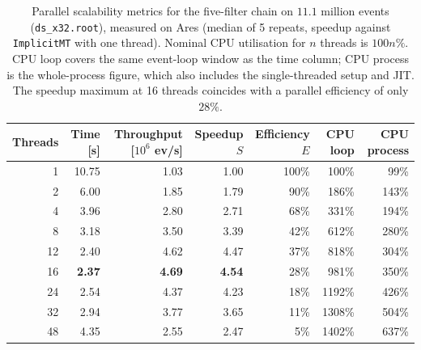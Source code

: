 \begin{table}[htbp]
\centering
\caption{Parallel scalability metrics for the five-filter chain on $11.1$ million events (\texttt{ds\_x32.root}), measured on Ares (median of 5 repeats, speedup against \texttt{ImplicitMT} with one thread). Nominal CPU utilisation for $n$ threads is $100n\%$. CPU loop covers the same event-loop window as the time column; CPU process is the whole-process figure, which also includes the single-threaded setup and JIT. The speedup maximum at 16 threads coincides with a parallel efficiency of only $28\%$.}
\label{tab:scalability-chain}
\begin{tabular}{rrrrrrr}
\toprule
Threads & Time [s] & Throughput [$10^6$ ev/s] & Speedup $S$ & Efficiency $E$ & CPU loop & CPU process \\
\midrule
 1 & 10.75 & 1.03 & 1.00 & 100\% & 100\% & 99\% \\
 2 & 6.00 & 1.85 & 1.79 & 90\% & 186\% & 143\% \\
 4 & 3.96 & 2.80 & 2.71 & 68\% & 331\% & 194\% \\
 8 & 3.18 & 3.50 & 3.39 & 42\% & 612\% & 280\% \\
12 & 2.40 & 4.62 & 4.47 & 37\% & 818\% & 304\% \\
16 & \textbf{2.37} & \textbf{4.69} & \textbf{4.54} & 28\% & 981\% & 350\% \\
24 & 2.54 & 4.37 & 4.23 & 18\% & 1192\% & 426\% \\
32 & 2.94 & 3.77 & 3.65 & 11\% & 1308\% & 504\% \\
48 & 4.35 & 2.55 & 2.47 & 5\% & 1402\% & 637\% \\
\bottomrule
\end{tabular}
\end{table}
